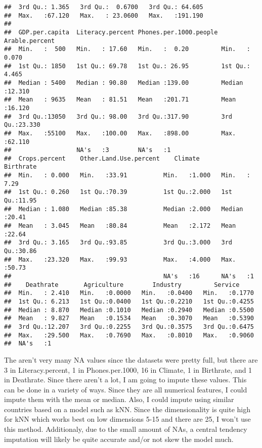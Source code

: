 \documentclass[]{article}
\begin{document}
\begin{verbatim}
##  3rd Qu.: 1.365   3rd Qu.:  0.6700   3rd Qu.: 64.605                 
##  Max.   :67.120   Max.   : 23.0600   Max.   :191.190                 
##                                                                      
##  GDP.per.capita  Literacy.percent Phones.per.1000.people Arable.percent  
##  Min.   :  500   Min.   : 17.60   Min.   :  0.20         Min.   : 0.070  
##  1st Qu.: 1850   1st Qu.: 69.78   1st Qu.: 26.95         1st Qu.: 4.465  
##  Median : 5400   Median : 90.80   Median :139.00         Median :12.310  
##  Mean   : 9635   Mean   : 81.51   Mean   :201.71         Mean   :16.120  
##  3rd Qu.:13050   3rd Qu.: 98.00   3rd Qu.:317.90         3rd Qu.:23.330  
##  Max.   :55100   Max.   :100.00   Max.   :898.00         Max.   :62.110  
##                  NA's   :3        NA's   :1                              
##  Crops.percent    Other.Land.Use.percent    Climate        Birthrate    
##  Min.   : 0.000   Min.   :33.91          Min.   :1.000   Min.   : 7.29  
##  1st Qu.: 0.260   1st Qu.:70.39          1st Qu.:2.000   1st Qu.:11.95  
##  Median : 1.080   Median :85.38          Median :2.000   Median :20.41  
##  Mean   : 3.045   Mean   :80.84          Mean   :2.172   Mean   :22.64  
##  3rd Qu.: 3.165   3rd Qu.:93.85          3rd Qu.:3.000   3rd Qu.:30.86  
##  Max.   :23.320   Max.   :99.93          Max.   :4.000   Max.   :50.73  
##                                          NA's   :16      NA's   :1      
##    Deathrate       Agriculture        Industry         Service      
##  Min.   : 2.410   Min.   :0.0000   Min.   :0.0400   Min.   :0.1770  
##  1st Qu.: 6.213   1st Qu.:0.0400   1st Qu.:0.2210   1st Qu.:0.4255  
##  Median : 8.870   Median :0.1010   Median :0.2940   Median :0.5500  
##  Mean   : 9.827   Mean   :0.1534   Mean   :0.3070   Mean   :0.5390  
##  3rd Qu.:12.207   3rd Qu.:0.2255   3rd Qu.:0.3575   3rd Qu.:0.6475  
##  Max.   :29.500   Max.   :0.7690   Max.   :0.8010   Max.   :0.9060  
##  NA's   :1
\end{verbatim}

The aren't very many NA values since the datasets were pretty full, but
there are 3 in Literacy.percent, 1 in Phones.per.1000, 16 in Climate, 1
in Birthrate, and 1 in Deathrate. Since there aren't a lot, I am going
to impute these values. This can be done in a variety of ways. Since
they are all numerical features, I could impute them with the mean or
median. Also, I could impute using similar countries based on a model
such as kNN. Since the dimensionality is quite high for kNN which works
best on low dimensions 5-15 and there are 25, I won't use this method.
Additionaly, due to the small amount of NAs, a central tendency
imputation will likely be quite accurate and/or not skew the model much.
\end{document}
